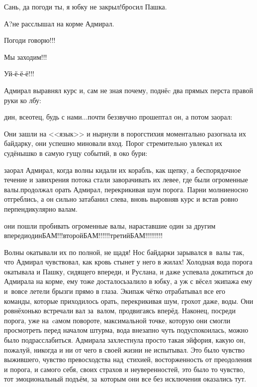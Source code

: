\diagdash Сань, да погоди ты, я юбку не закрыл!\mdash бросил Пашка.

\diagdash А?\mdash не расслышал на корме Адмирал.

\diagdash Погоди говорю!!!

\diagdash Мы заходим!!!

\diagdash Уй-ё-ё-ё!!!

Адмирал выравнял курс и, сам не зная почему, поднёc два прямых перста правой руки ко лбу:

дин, всеотец, будь с нами$\ldots$\mdash почти беззвучно прошептал он, а потом заорал:

Они зашли на <<язык>> и нырнули в порог\mdash стихия моментально разогнала их байдарку, они успешно миновали вход. Порог стремительно увлекал их судёнышко в самую гущу событий, в око бури:

\mdash заорал Адмирал, когда волны кидали их корабль, как щепку, а беспорядочное течение и завихрения потока стали заворачивать их левее, где были огроменные валы.\mdash продолжал орать Адмирал, перекрикивая шум порога. Парни молниеносно отгреблись, а он сильно затабанил слева, вновь выровняв курс и встав ровно перпендикулярно валам. 

\mdash они пошли пробивать огроменные валы, нараставшие один за другим впереди\mdash один\mdash БАМ!!!\mdash второй\mdash БАМ!!!!!!\mdash третий\mdash БАМ!!!!!!!!!

Волны окатывали их по полной, не щадя! Нос байдарки зарывался в~валы так, что Адмирал чувствовал, как кровь стынет у него в жилах! Холодная вода порога окатывала и Пашку, сидящего впереди, и Руслана, и даже успевала докатиться до Адмирала на корме, ему тоже досталось\mdash залило в юбку, а уж с вёсел экипажа ему и~вовсе летели брызги прямо в глаза. Экипаж чётко отрабатывал все его команды, которые приходилось орать, перекрикивая шум, грохот даже, воды. Они ровнёхонько встречали вал за~валом, продвигаясь вперёд. Наконец, посреди порога, уже на~cамом повороте, максимальной точке, которую они смогли просмотреть перед началом штурма, вода внезапно чуть подуспокоилась, можно было подрасслабиться. Адмирала захлестнула просто такая эйфория, какую он, пожалуй, никогда и ни от чего в своей жизни не испытывал. Это было чувство выжившего, чувство превосходства над~стихией, восторженность от преодоления и порога, и самого себя, своих страхов и неуверенностей, это было то чувство, тот эмоциональный подъём, за~которым они все без исключения оказались тут. 

